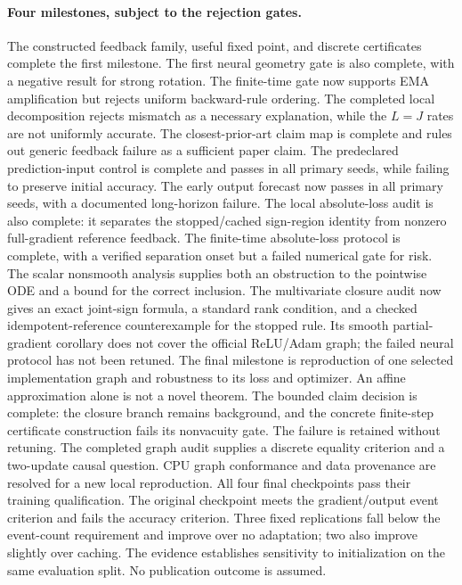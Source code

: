 \documentclass[11pt,a4paper]{article}
\begin{document}
\paragraph{Four milestones, subject to the rejection gates.}
The constructed feedback family, useful fixed point, and discrete
certificates complete the first milestone. The first neural geometry gate
is also complete, with a negative result for strong rotation. The finite-time
gate now supports EMA amplification but rejects uniform backward-rule
ordering. The completed local decomposition rejects mismatch as a
necessary explanation, while the $L=J$ rates are not uniformly
accurate. The closest-prior-art claim map is complete and rules out
generic feedback failure as a sufficient paper claim. The predeclared
prediction-input control is complete and passes in all primary seeds,
while failing to preserve initial accuracy. The early output forecast
now passes in all primary seeds, with a documented long-horizon failure.
The local absolute-loss audit is also complete: it separates the
stopped/cached sign-region identity from nonzero full-gradient reference
feedback. The finite-time absolute-loss protocol is complete, with a
verified separation onset but a failed numerical gate for risk. The
scalar nonsmooth analysis supplies both an obstruction to the pointwise
ODE and a bound for the correct inclusion. The multivariate closure audit
now gives an exact joint-sign formula, a standard rank condition, and
a checked idempotent-reference counterexample for the stopped rule.
Its smooth partial-gradient corollary does not cover the official
ReLU/Adam graph; the failed neural protocol has not been retuned.
The final milestone is reproduction of one selected implementation graph
and robustness to its loss and optimizer. An affine approximation alone is not a novel theorem.
The bounded claim decision is complete: the closure branch remains
background, and the concrete finite-step certificate construction fails
its nonvacuity gate. The failure is retained without retuning. The completed
graph audit supplies a discrete equality criterion and a two-update causal
question. CPU graph conformance and data provenance are resolved for a
new local reproduction. All four final checkpoints pass their training
qualification. The original checkpoint meets the gradient/output event
criterion and fails the accuracy criterion. Three fixed replications
fall below the event-count requirement and improve over no adaptation;
two also improve slightly over caching. The evidence establishes
sensitivity to initialization on the same evaluation split.
No publication outcome is assumed.
\end{document}
